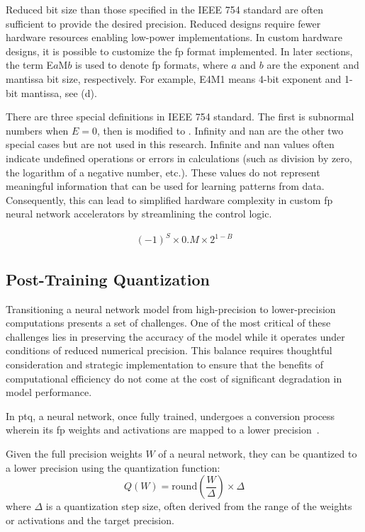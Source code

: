 Reduced bit size than those specified in the IEEE 754 standard are often sufficient to provide the desired precision. Reduced designs require fewer hardware resources enabling low-power implementations. In custom hardware designs, it is possible to customize the \gls{fp} format implemented. In later sections, the term E$a$M$b$ is used to denote \gls{fp} formats, where $a$ and $b$ are the exponent and mantissa bit size, respectively. For example, E4M1 means 4-bit exponent and 1-bit mantissa, see (d).

There are three special definitions in IEEE 754 standard. The first is subnormal numbers when $E=0$, then  is modified to . Infinity and \gls{nan} are the other two special cases but are not used in this research. Infinite and \gls{nan} values often indicate undefined operations or errors in calculations (such as division by zero, the logarithm of a negative number, etc.). These values do not represent meaningful information that can be used for learning patterns from data. Consequently, this can lead to simplified hardware complexity in custom \gls{fp} neural network accelerators by streamlining the control logic.

\begin{eqnarray} \label{eq:float_subnorm}
(-1)^{S} \times 0.M \times 2^{1-B}
\end{eqnarray}

\subsection{Post-Training Quantization}
Transitioning a neural network model from high-precision to lower-precision computations presents a set of challenges. One of the most critical of these challenges lies in preserving the accuracy of the model while it operates under conditions of reduced numerical precision. This balance requires thoughtful consideration and strategic implementation to ensure that the benefits of computational efficiency do not come at the cost of significant degradation in model performance.

In \gls{ptq}, a neural network, once fully trained, undergoes a conversion process wherein its \gls{fp} weights and activations are mapped to a lower precision~\cite{krishnamoorthi2018quantizing}.

Given the full precision weights \( W \) of a neural network, they can be quantized to a lower precision using the quantization function:
\begin{equation}
Q(W) = \text{round}\left(\frac{W}{\Delta}\right) \times \Delta
\end{equation}
where \( \Delta \) is a quantization step size, often derived from the range of the weights or activations and the target precision.

